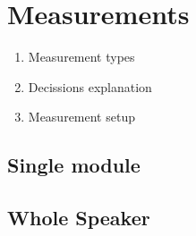 \section{Measurements}

\begin{enumerate}
  \item Measurement types
  \item Decissions
  \subitem explanation
  \item Measurement setup
\end{enumerate}

\subsection{Single module}
\subsection{Whole Speaker}